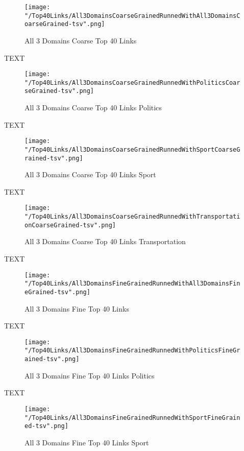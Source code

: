 \documentclass[thesis=M,english]{FITthesis}[2018/05/30]
\begin{document}
	\begin{figure}[H]\centering
		\texttt{[image: "/Top40Links/All3DomainsCoarseGrainedRunnedWithAll3DomainsCoarseGrained-tsv".png]}
		\caption{All 3 Domains Coarse Top 40 Links}\label{}
	\end{figure}

	TEXT

	\begin{figure}[H]\centering
		\texttt{[image: "/Top40Links/All3DomainsCoarseGrainedRunnedWithPoliticsCoarseGrained-tsv".png]}
		\caption{All 3 Domains Coarse Top 40 Links Politics}\label{}
	\end{figure}	

	TEXT	

	\begin{figure}[H]\centering
		\texttt{[image: "/Top40Links/All3DomainsCoarseGrainedRunnedWithSportCoarseGrained-tsv".png]}
		\caption{All 3 Domains Coarse Top 40 Links Sport}\label{}
	\end{figure}
	
		TEXT	

	\begin{figure}[H]\centering
		\texttt{[image: "/Top40Links/All3DomainsCoarseGrainedRunnedWithTransportationCoarseGrained-tsv".png]}
		\caption{All 3 Domains Coarse Top 40 Links Transportation}\label{}	
	\end{figure}
		
		TEXT	

	\begin{figure}[H]\centering
		\texttt{[image: "/Top40Links/All3DomainsFineGrainedRunnedWithAll3DomainsFineGrained-tsv".png]}
		\caption{All 3 Domains Fine Top 40 Links }\label{}	
	\end{figure}
	
	TEXT

	\begin{figure}[H]\centering
		\texttt{[image: "/Top40Links/All3DomainsFineGrainedRunnedWithPoliticsFineGrained-tsv".png]}
		\caption{All 3 Domains Fine Top 40 Links Politics}\label{}
	\end{figure}	

	TEXT	

	\begin{figure}[H]\centering
		\texttt{[image: "/Top40Links/All3DomainsFineGrainedRunnedWithSportFineGrained-tsv".png]}
		\caption{All 3 Domains Fine Top 40 Links Sport}\label{}
	\end{figure}
	
\end{document}
